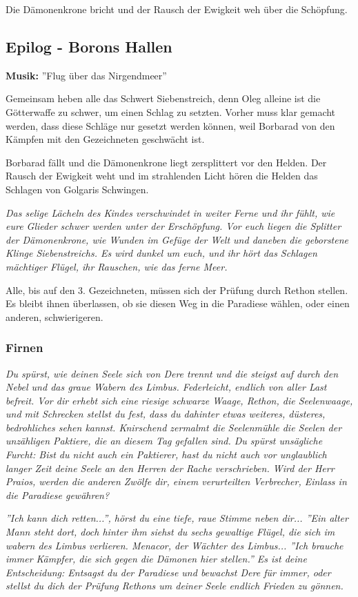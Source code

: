 Die Dämonenkrone bricht und der Rausch der Ewigkeit weh über die Schöpfung.

\subsection{Epilog - Borons Hallen}
\textbf{Musik:} ''Flug über das Nirgendmeer''

Gemeinsam heben alle das Schwert Siebenstreich, denn Oleg alleine ist die Götterwaffe zu schwer, um einen Schlag zu setzten. Vorher muss klar gemacht werden, dass diese Schläge nur gesetzt werden können, weil Borbarad von den Kämpfen mit den Gezeichneten geschwächt ist.

Borbarad fällt und die Dämonenkrone liegt zersplittert vor den Helden. Der Rausch der Ewigkeit weht und im strahlenden Licht hören die Helden das Schlagen von Golgaris Schwingen.

\emph{Das selige Lächeln des Kindes verschwindet in weiter Ferne und ihr fühlt, wie eure Glieder schwer werden unter der Erschöpfung. Vor euch liegen die Splitter der Dämonenkrone, wie Wunden im Gefüge der Welt und daneben die geborstene Klinge Siebenstreichs. Es wird dunkel um euch, und ihr hört das Schlagen mächtiger Flügel, ihr Rauschen, wie das ferne Meer.}

Alle, bis auf den 3. Gezeichneten, müssen sich der Prüfung durch Rethon stellen. Es bleibt ihnen überlassen, ob sie diesen Weg in die Paradiese wählen, oder einen anderen, schwierigeren.
 
\subsubsection{Firnen}

\emph{Du spürst, wie deinen Seele sich von Dere trennt und die steigst auf durch den Nebel und das graue Wabern des Limbus. Federleicht, endlich von aller Last befreit. Vor dir erhebt sich eine riesige schwarze Waage, Rethon, die Seelenwaage, und mit Schrecken stellst du fest, dass du dahinter etwas weiteres, düsteres, bedrohliches sehen kannst. Knirschend zermalmt die Seelenmühle die Seelen der unzähligen Paktiere, die an diesem Tag gefallen sind. Du spürst unsägliche Furcht: Bist du nicht auch ein Paktierer, hast du nicht auch vor unglaublich langer Zeit deine Seele an den Herren der Rache verschrieben. Wird der Herr Praios, werden die anderen Zwölfe dir, einem verurteilten Verbrecher, Einlass in die Paradiese gewähren?}

\emph{''Ich kann dich retten...'', hörst du eine tiefe, raue Stimme neben dir... ''Ein alter Mann steht dort, doch hinter ihm siehst du sechs gewaltige Flügel, die sich im wabern des Limbus verlieren. Menacor, der Wächter des Limbus... ''Ich brauche immer Kämpfer, die sich gegen die Dämonen hier stellen.'' Es ist deine Entscheidung: Entsagst du der Paradiese und bewachst Dere für immer, oder stellst du dich der Prüfung Rethons um deiner Seele endlich Frieden zu gönnen. }

